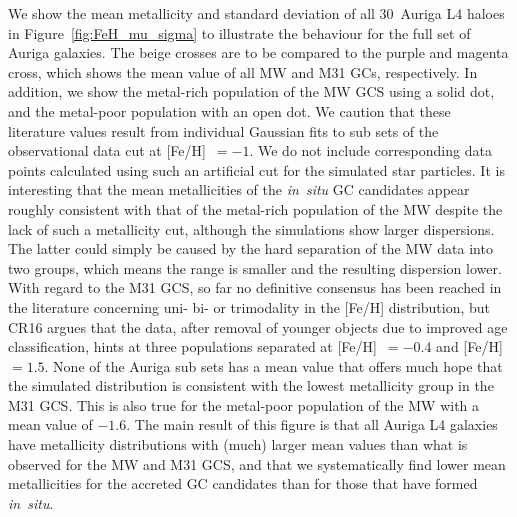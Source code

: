 \documentclass[a4paper,fleqn,usenatbib]{mnras}
\begin{document}
We show the mean metallicity and standard deviation of all $30$~Auriga L4 haloes
in Figure~\ref{fig:FeH_mu_sigma} to illustrate the behaviour for the full set of Auriga
galaxies. The beige crosses are to be compared to the purple and magenta cross, 
which shows the mean value of all MW and M31 GCs, respectively. In addition, we 
show the metal-rich population of the MW GCS using a solid dot, and the metal-poor
population with an open dot. We caution that
these literature values result from individual Gaussian fits to sub sets of the 
observational data cut at [Fe/H]~$= -1$. We do not include corresponding data 
points calculated using such an artificial cut for the simulated star particles.
It is interesting that the mean metallicities of the {\it in~situ} GC candidates 
appear roughly consistent with that of the metal-rich population of the MW despite 
the lack of such a metallicity cut, although the simulations show larger dispersions. 
The latter could simply be caused by the hard separation of the MW data into two 
groups, which means the range is smaller and the resulting dispersion lower. With 
regard to the M31 GCS, so far no definitive consensus has been reached
in the literature concerning uni- bi- or trimodality in the [Fe/H] distribution, 
but CR16 argues that the data, after removal of younger objects due to improved 
age classification, hints at three populations separated at [Fe/H]~$=-0.4$ and 
[Fe/H]~$ = 1.5$. None of the Auriga sub sets has a mean value that offers much 
hope that the simulated distribution is consistent with the lowest metallicity 
group in the M31 GCS. This is also true for the metal-poor population of the 
MW with a mean value of $-1.6$. The main result of this figure is 
that all Auriga L4 galaxies have metallicity distributions with (much) larger
mean values than what is observed for the MW and M31 GCS, and that we 
systematically find lower mean metallicities for the accreted GC candidates
than for those that have formed {\it in~situ}.

\end{document}
